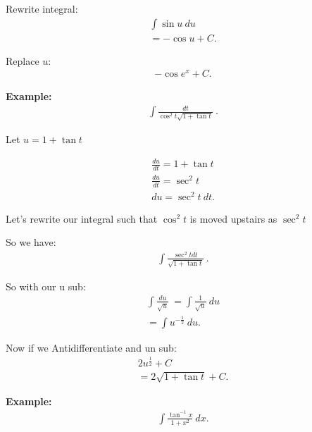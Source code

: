\documentclass{report}
\begin{document}
  \bigbreak \noindent \bigbreak \noindent 
  Rewrite integral:
  \begin{align*}
    \int \sin{u}\ du \\
    = -\cos{u} + C
  .\end{align*}

  \bigbreak \noindent \bigbreak \noindent 
  Replace $u$:
  \begin{align*}
   \boxed{-\cos{e^{x}} + C} 
  .\end{align*}

  \bigbreak \noindent 
  \begin{mdframed}
    \textbf{Example: }
    \begin{align*}
      \int \frac{dt}{\cos^{2}{t}\sqrt{1+\tan{t}}}\ 
    .\end{align*}
  \end{mdframed}

  \bigbreak \noindent \bigbreak \noindent
  Let $u = 1+ \tan{t}$

  \begin{align*}
    \frac{du}{dt} = 1+ \tan{t} \\
    \frac{du}{dt} = \sec^{2}{t} \\
    du = \sec^{2}{t}\ dt
  .\end{align*}

  \pagebreak \bigbreak \noindent
  Let's rewrite our integral such that $\cos^{2}{t}$ is moved upstairs as $\sec^{2}{t} $

  \bigbreak \noindent 
  So we have:
  \begin{align*}
    \int \frac{\sec^{2}{t}dt}{\sqrt{1+\tan{t}}}\ 
  .\end{align*}

  \bigbreak \noindent \bigbreak \noindent 
  So with our u sub:
  \begin{align*}
    \int \frac{du}{\sqrt{u}}\  
     = \int \frac{1}{\sqrt{u}}\ du  \\
     = \int u^{-\frac{1}{2}}\ du
  .\end{align*}

  \bigbreak \noindent \bigbreak \noindent
  Now if we Antidifferentiate and un sub:
  \begin{align*}
    2u^{\frac{1}{2}} + C \\
     \boxed{=2\sqrt{1+\tan{t}} + C}
  .\end{align*}

  \bigbreak \noindent 
  \begin{mdframed}
    \textbf{Example: }
    \begin{align*}
      \int \frac{\tan^{-1}{x}}{1+x^{2}}\ dx
    .\end{align*}
  \end{mdframed}
\end{document}

